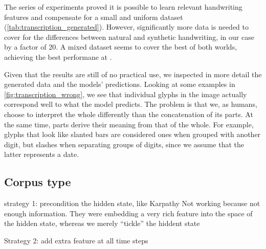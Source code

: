 			The series of experiments proved it is possible to learn relevant handwriting features and compensate for a small and uniform dataset (\autoref{tab:transcription_generated}).  However, significantly more data is needed to cover for the differences between natural and synthetic handwriting, in our case by a factor of 20. A mixed dataset seems to cover the best of both worlds, achieving the best performane at .

			Given that the results are still of no practical use, we inspected in more detail the generated data and the models' predictions. Looking at some examples in \autoref{fig:transcription_wrong}, we see that individual glyphs in the image actually correspond well to what the model predicts. The problem is that we, as humans, choose to interpret the whole differently than the concatenation of its parts. At the same time, parts derive their meaning from that of the whole. For example, glyphs that look like slanted bars are considered ones when grouped with another digit, but slashes when separating groups of digits, since we assume that the latter represents a date.


	\subsection{Corpus type}
		strategy 1: precondition the hidden state, like Karpathy
		Not working because not enough information. They were embedding a very rich feature into the space of the hidden state, whereas we merely ``tickle'' the hiddent state

		Strategy 2: add extra feature at all time steps




